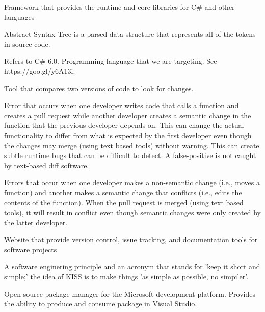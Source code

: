 \documentclass[draftclsnofoot,onecolumn]{IEEEtran}
\begin{document}
\begin{description} %

\item[.NET:] Framework that provides the runtime and core libraries for C\# and other languages

\item[AST:] Abstract Syntax Tree is a parsed data structure that represents all of the tokens in source code.

\item[C\#:] Refers to C\# 6.0. Programming language that we are targeting. See https://goo.gl/y6A13i.

\item[Diff:] Tool that compares two versions of code to look for changes.

\item[False-Positive:] Error that occurs when one developer writes code that calls a function and creates a pull request while another developer creates a semantic change in the function that the previous developer depends on. This can change the actual functionality to differ from what is expected by the first developer even though the changes may merge (using text based tools) without warning. This can create subtle runtime bugs that can be difficult to detect. A false-positive is not caught by text-based diff software.

\item[False-Negative:] Errors that occur when one developer makes a non-semantic change (i.e., moves a function) and another makes a semantic change that conflicts (i.e., edits the contents of the function). When the pull request is merged (using text based tools), it will result in conflict even though semantic changes were only created by the latter developer.

\item[GitHub:] Website that provide version control, issue tracking, and documentation tools for software projects

\item[KISS:] A software enginering principle and an acronym that stands for 'keep it short and simple;' the idea of KISS is to make things 'as simple as possible, no simpiler'.

\item[NuGet Package:] Open-source package manager for the Microsoft development platform. Provides the ability to produce and consume package in Visual Studio.


\end{description}
\end{document}
